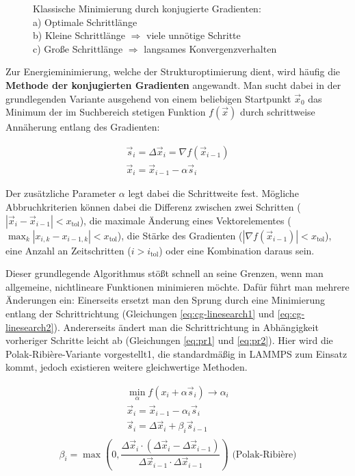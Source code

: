 \begin{figure}
  \centering
  \def\svgwidth{0.5\textwidth}
  
  \caption[CG-Methode]{Klassische Minimierung durch konjugierte Gradienten:\\
    a) Optimale Schrittlänge\\
    b) Kleine Schrittlänge $\Rightarrow$ viele unnötige Schritte\\
    c) Große Schrittlänge $\Rightarrow$ langsames Konvergenzverhalten
  }
  \label{fig:cg-gradient}
\end{figure}

Zur Energieminimierung, welche der Strukturoptimierung dient, wird häufig die \textbf{Methode der konjugierten Gradienten} angewandt.
Man sucht dabei in der grundlegenden Variante ausgehend von einem beliebigen Startpunkt $\vec x_0$ das Minimum der im Suchbereich stetigen Funktion $f(\vec x)$ durch schrittweise Annäherung entlang des Gradienten:

\begin{gather}
  \vec s_i = \Delta\vec x_i = \nabla f(\vec x_{i-1})\\
  \vec x_i = \vec x_{i-1} - \alpha \vec s_i
\end{gather}

Der zusätzliche Parameter $\alpha$ legt dabei die Schrittweite fest.
Mögliche Abbruchkriterien können dabei die Differenz zwischen zwei Schritten ($\left|\vec x_i - \vec x_{i-1}\right| < x_\text{tol}$), die maximale Änderung eines Vektorelementes ($\max_k{\left|x_{i,k} - x_{i-1,k}\right|} < x_\text{tol}$), die Stärke des Gradienten ($\left|\nabla f(\vec x_{i-1})\right| < x_\text{tol}$), eine Anzahl an Zeitschritten ($i > i_\text{tol}$) oder eine Kombination daraus sein.

Dieser grundlegende Algorithmus stößt schnell an seine Grenzen, wenn man allgemeine, nichtlineare Funktionen minimieren möchte.
Dafür führt man mehrere Änderungen ein:
Einerseits ersetzt man den Sprung durch eine Minimierung entlang der Schrittrichtung (Gleichungen \ref{eq:cg-linesearch1} und \ref{eq:cg-linesearch2}).
Andererseits ändert man die Schrittrichtung in Abhängigkeit vorheriger Schritte leicht ab (Gleichungen \ref{eq:pr1} und \ref{eq:pr2}).
Hier wird die Polak-Ribière-Variante vorgestellt1, die standardmäßig in LAMMPS zum Einsatz kommt, jedoch existieren weitere gleichwertige Methoden.

\begin{gather}
  \label{eq:cg-linesearch1}
  \min_\alpha f(x_i+\alpha \vec s_i) \rightarrow \alpha_i \\
  \label{eq:cg-linesearch2}
  \vec x_i = \vec x_{i-1} - \alpha_i \vec s_i\\
  \label{eq:pr1}
  \vec s_i = \Delta \vec x_i + \beta_i \vec s_{i-1}\\
\end{gather}
\begin{equation}
  \label{eq:pr2}
  \beta_i = \max \left(0, \frac{\Delta \vec x_i \cdot \left(\Delta \vec x_i - \Delta \vec x_{i-1}\right)}{\Delta \vec x_{i-1} \cdot \Delta \vec x_{i-1}}\right) \text{ (Polak-Ribière)}
\end{equation}

